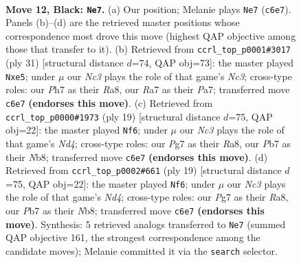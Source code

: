 \documentclass[11pt]{article}
\begin{document}
\begin{figure}[p]\centering
\begin{subfigure}{0.46\textwidth}\centering
\resizebox{\linewidth}{!}{%
\newchessgame
\chessboard[
  setfen={2b1qrk1/rppn1ppp/p1n1p3/3pP3/3P1P2/2N5/PPP2KPP/R2Q1BNR b - - 9 12},
  showmover=false,
  pgfstyle=straightmove, color=movearrow, markmove={c6-e7}
]}
\caption{}
\end{subfigure}\hfill
\begin{subfigure}{0.46\textwidth}\centering
\resizebox{\linewidth}{!}{%
\newchessgame
\chessboard[
  setfen={r4rk1/pppq1pbp/2np2p1/3NP2n/1PP1P3/6P1/P3NPKP/1RBQ1R2 b - - 0 16},
  showmover=false,
  pgfstyle=straightmove, color=movearrow, markmove={c6-e5}
]}
\caption{}
\end{subfigure}
\\[4pt]
\begin{subfigure}{0.46\textwidth}\centering
\resizebox{\linewidth}{!}{%
\newchessgame
\chessboard[
  setfen={rn3rk1/pbp1qppp/1p2p3/3n4/3P4/P1N1PN2/1P3PPP/2RQKB1R b K - 0 10},
  showmover=false,
  pgfstyle=straightmove, color=movearrow, markmove={d5-f6}
]}
\caption{}
\end{subfigure}\hfill
\begin{subfigure}{0.46\textwidth}\centering
\resizebox{\linewidth}{!}{%
\newchessgame
\chessboard[
  setfen={rn3rk1/pbp1qppp/1p2p3/3n4/3P4/P1N1PN2/1P3PPP/2RQKB1R b K - 0 10},
  showmover=false,
  pgfstyle=straightmove, color=movearrow, markmove={d5-f6}
]}
\caption{}
\end{subfigure}
\caption{\textbf{Move 12, Black: \texttt{Ne7}.} (a) Our position; Melanie plays \texttt{Ne7} (\texttt{c6e7}). Panels (b)--(d) are the retrieved master positions whose correspondence most drove this move (highest QAP objective among those that transfer to it). (b) Retrieved from \texttt{ccrl\_top\_p0001\#3017} (ply 31) [structural distance $d$=74, QAP obj=73]: the master played \texttt{Nxe5}; under $\mu$ our \emph{Nc3} plays the role of that game's \emph{Nc3}; cross-type roles: our \emph{P}h7 as their \emph{R}a8, our \emph{R}a7 as their \emph{P}a7; transferred move \texttt{c6e7} \textbf{(endorses this move)}. (c) Retrieved from \texttt{ccrl\_top\_p0000\#1973} (ply 19) [structural distance $d$=75, QAP obj=22]: the master played \texttt{Nf6}; under $\mu$ our \emph{Nc3} plays the role of that game's \emph{Nd4}; cross-type roles: our \emph{P}g7 as their \emph{R}a8, our \emph{P}b7 as their \emph{N}b8; transferred move \texttt{c6e7} \textbf{(endorses this move)}. (d) Retrieved from \texttt{ccrl\_top\_p0002\#661} (ply 19) [structural distance $d$=75, QAP obj=22]: the master played \texttt{Nf6}; under $\mu$ our \emph{Nc3} plays the role of that game's \emph{Nd4}; cross-type roles: our \emph{P}g7 as their \emph{R}a8, our \emph{P}b7 as their \emph{N}b8; transferred move \texttt{c6e7} \textbf{(endorses this move)}. Synthesis: 5 retrieved analogs transferred to \texttt{Ne7} (summed QAP objective 161, the strongest correspondence among the candidate moves); Melanie committed it via the \texttt{search} selector.}
\label{fig:thought-m23}
\end{figure}
\end{document}
